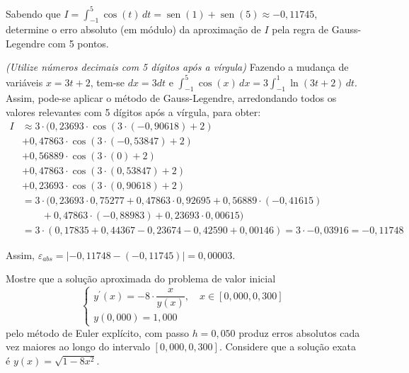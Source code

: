 \documentclass[12pt,a4paper]{article}
\begin{document}
\begin{ExerciseList}
\Exercise[title={2,5}]
Sabendo que
$I = \int_{-1}^{5} \cos(t) \, dt
= \operatorname{sen}(1) + \operatorname{sen}(5)
\approx -0,11745$,
determine o erro absoluto (em módulo) da aproximação de $I$ pela regra de Gauss-Legendre com 5 pontos.

{\color{blue} \textit{(Utilize números decimais com 5 dígitos após a vírgula)}}
\Answer
Fazendo a mudança de variáveis $x = 3t + 2$, tem-se $dx = 3 dt$ e
$\int_{-1}^{5} \cos(x)\,dx = 3\int_{-1}^1 \ln(3t + 2)\,dt$.
Assim, pode-se aplicar o método de Gauss-Legendre, arredondando todos os valores relevantes com 5 dígitos após a vírgula, para obter:
\begin{align*}
I & \approx
3 \cdot (
    0,23693 \cdot \cos(3\cdot (-0,90618) + 2) \\
& + 0,47863 \cdot \cos(3\cdot (-0,53847) + 2) \\
& + 0,56889 \cdot \cos(3\cdot ( 0      ) + 2) \\
& + 0,47863 \cdot \cos(3\cdot ( 0,53847) + 2) \\
& + 0,23693 \cdot \cos(3\cdot ( 0,90618) + 2) \\
& =
3\cdot (
  0,23693 \cdot  0,75277
+ 0,47863 \cdot  0,92695
+ 0,56889 \cdot (-0,41615) \\
& \qquad
+ 0,47863 \cdot (-0,88983)
+ 0,23693 \cdot  0,00615)\\
& = 3 \cdot (0,17835 + 0,44367 - 0,23674 - 0,42590 + 0,00146)
= 3 \cdot - 0,03916
= -0,11748
\end{align*}

Assim, $\varepsilon_{abs} = |-0,11748 - (-0,11745)| = 0,00003$.


\Exercise[title={2,5}]
Mostre que a solução aproximada do problema de valor inicial
\[
\begin{cases}
y^\prime(x) = -8 \cdot \dfrac{x}{y(x)}, \quad x \in [0,000, 0,300]\\
y(0,000) = 1,000
\end{cases}
\]
pelo método de Euler explícito, com passo $h=0,050$ produz erros absolutos cada vez maiores ao longo do intervalo $[0,000, 0,300]$. Considere que a solução exata é $y(x) = \sqrt{1-8x^2}$.


\end{ExerciseList}
\end{document}
